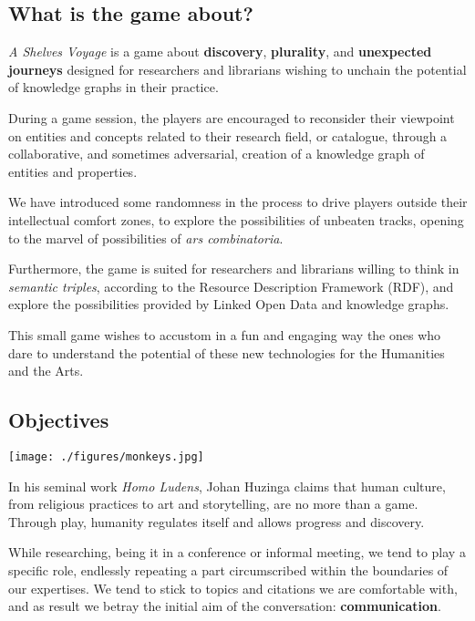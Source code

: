 \documentclass[12pt,a4paper]{book}
\theoremstyle{definition}
\begin{document}
\subsection{What is the game about?}

\textit{A Shelves Voyage} is a game about \textbf{discovery}, \textbf{plurality}, and \textbf{unexpected journeys} designed for researchers and librarians wishing to unchain the potential of knowledge graphs in their practice.

During a game session, the players are encouraged to reconsider their viewpoint on entities and concepts related to their research field, or catalogue, through a collaborative, and sometimes adversarial, creation of a knowledge graph of entities and properties. 

We have introduced some randomness in the process to drive players outside their intellectual comfort zones, to explore the possibilities of unbeaten tracks, opening to the marvel of possibilities of \textit{ars combinatoria}.  

Furthermore, the game is suited for researchers and librarians willing to think in \textit{semantic triples}, according to the Resource Description Framework (RDF), and explore the possibilities provided by Linked Open Data and knowledge graphs. 

This small game wishes to accustom in a fun and engaging way the ones who dare to understand the potential of these new technologies for the Humanities and the Arts. 

\newpage

\subsection{Objectives}

\begin{center}
\texttt{[image: ./figures/monkeys.jpg]}
\end{center}

In his seminal work \textit{Homo Ludens}, Johan Huzinga claims that human culture, from religious practices to art and storytelling, are no more than a game. Through play, humanity regulates itself and allows progress and discovery.

While researching, being it in a conference or informal meeting, we tend to play a specific role, endlessly repeating a part circumscribed within the boundaries of our expertises. We tend to stick to topics and citations we are comfortable with, and as result we betray the initial aim of the conversation: \textbf{communication}. 
\end{document}

